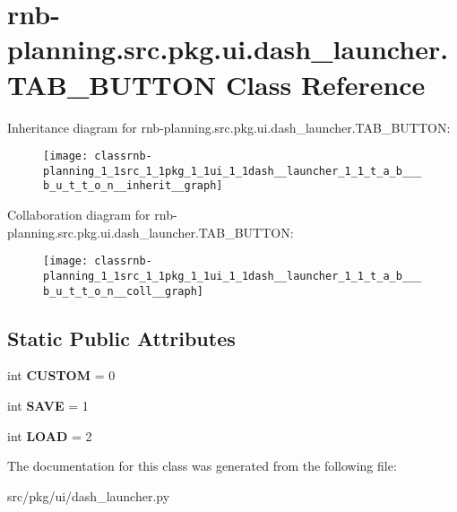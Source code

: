 \hypertarget{classrnb-planning_1_1src_1_1pkg_1_1ui_1_1dash__launcher_1_1_t_a_b___b_u_t_t_o_n}{}\section{rnb-\/planning.src.\+pkg.\+ui.\+dash\+\_\+launcher.\+T\+A\+B\+\_\+\+B\+U\+T\+T\+ON Class Reference}
\label{classrnb-planning_1_1src_1_1pkg_1_1ui_1_1dash__launcher_1_1_t_a_b___b_u_t_t_o_n}


Inheritance diagram for rnb-\/planning.src.\+pkg.\+ui.\+dash\+\_\+launcher.\+T\+A\+B\+\_\+\+B\+U\+T\+T\+ON\+:
\nopagebreak
\begin{figure}[H]
\begin{center}
\leavevmode
\texttt{[image: classrnb-planning\_1\_1src\_1\_1pkg\_1\_1ui\_1\_1dash\_\_launcher\_1\_1\_t\_a\_b\_\_\_b\_u\_t\_t\_o\_n\_\_inherit\_\_graph]}
\end{center}
\end{figure}


Collaboration diagram for rnb-\/planning.src.\+pkg.\+ui.\+dash\+\_\+launcher.\+T\+A\+B\+\_\+\+B\+U\+T\+T\+ON\+:
\nopagebreak
\begin{figure}[H]
\begin{center}
\leavevmode
\texttt{[image: classrnb-planning\_1\_1src\_1\_1pkg\_1\_1ui\_1\_1dash\_\_launcher\_1\_1\_t\_a\_b\_\_\_b\_u\_t\_t\_o\_n\_\_coll\_\_graph]}
\end{center}
\end{figure}
\subsection*{Static Public Attributes}
\begin{DoxyCompactItemize}
\item 
\mbox{\label{classrnb-planning_1_1src_1_1pkg_1_1ui_1_1dash__launcher_1_1_t_a_b___b_u_t_t_o_n_a4889ff9630112b8357b353602e4c5059}} 
int {\bfseries C\+U\+S\+T\+OM} = 0
\item 
\mbox{\label{classrnb-planning_1_1src_1_1pkg_1_1ui_1_1dash__launcher_1_1_t_a_b___b_u_t_t_o_n_a8ea89621dfd606252326e1beff31adaa}} 
int {\bfseries S\+A\+VE} = 1
\item 
\mbox{\label{classrnb-planning_1_1src_1_1pkg_1_1ui_1_1dash__launcher_1_1_t_a_b___b_u_t_t_o_n_a62c823a9bd4ec7a004a624658b29d9f2}} 
int {\bfseries L\+O\+AD} = 2
\end{DoxyCompactItemize}


The documentation for this class was generated from the following file\+:\begin{DoxyCompactItemize}
\item 
src/pkg/ui/dash\+\_\+launcher.\+py\end{DoxyCompactItemize}
